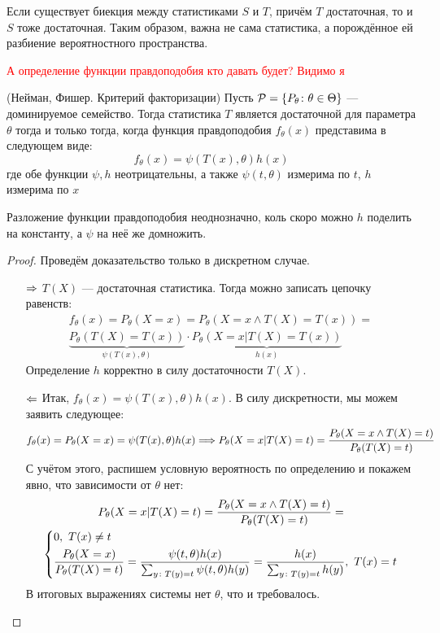 \begin{note}
	Если существует биекция между статистиками $S$ и $T$, причём $T$ достаточная, то и $S$ тоже достаточная. Таким образом, важна не сама статистика, а порождённое ей разбиение вероятностного пространства.
\end{note}

\textcolor{red}{А определение функции правдоподобия кто давать будет? Видимо я}

\begin{theorem} (Нейман, Фишер. Критерий факторизации)
	Пусть $\mathcal{P} = \{P_\theta \colon \theta \in \Theta\}$ --- доминируемое семейство. Тогда статистика $T$ является достаточной для параметра $\theta$ тогда и только тогда, когда функция правдоподобия $f_\theta(x)$ представима в следующем виде:
	\[
		f_\theta(x) = \psi(T(x), \theta)h(x)
	\]
	где обе функции $\psi, h$ неотрицательны, а также $\psi(t, \theta)$ измерима по $t$, $h$ измерима по $x$
\end{theorem}

\begin{note}
	Разложение функции правдоподобия неоднозначно, коль скоро можно $h$ поделить на константу, а $\psi$ на неё же домножить.
\end{note}

\begin{proof}
	Проведём доказательство только в дискретном случае.
	\begin{itemize}
		\item[$\Rightarrow$] $T(X)$ --- достаточная статистика. Тогда можно записать цепочку равенств:
		\begin{multline*}
			f_\theta(x) = P_\theta(X = x) = P_\theta(X = x \wedge T(X) = T(x)) =
			\\
			\underbrace{P_\theta(T(X) = T(x))}_{\psi(T(x), \theta)} \cdot \underbrace{P_\theta(X = x | T(X) = T(x))}_{h(x)}
		\end{multline*}
		Определение $h$ корректно в силу достаточности $T(X)$.
		
		\item[$\Leftarrow$] Итак, $f_\theta(x) = \psi(T(x), \theta)h(x)$. В силу дискретности, мы можем заявить следующее:
		\[
			f_\theta(x) = P_\theta(X = x) = \psi(T(x), \theta)h(x) \Longrightarrow P_\theta(X = x | T(X) = t) = \frac{P_\theta(X = x \wedge T(X) = t)}{P_\theta(T(X) = t)}
		\]
		С учётом этого, распишем условную вероятность по определению и покажем явно, что зависимости от $\theta$ нет:
		\begin{multline*}
			P_\theta(X = x | T(X) = t) = \frac{P_\theta(X = x \wedge T(X) = t)}{P_\theta(T(X) = t)} =
			\\
			\left\{\begin{aligned}
				&{0,\ T(x) \neq t}
				\\
				&{\frac{P_\theta(X = x)}{P_\theta(T(X) = t)} = \frac{\psi(t, \theta)h(x)}{\sum_{y \colon T(y) = t} \psi(t, \theta)h(y)} = \frac{h(x)}{\sum_{y \colon T(y) = t} h(y)},\ T(x) = t}
			\end{aligned}\right.
		\end{multline*}
		В итоговых выражениях системы нет $\theta$, что и требовалось.
	\end{itemize}
\end{proof}


